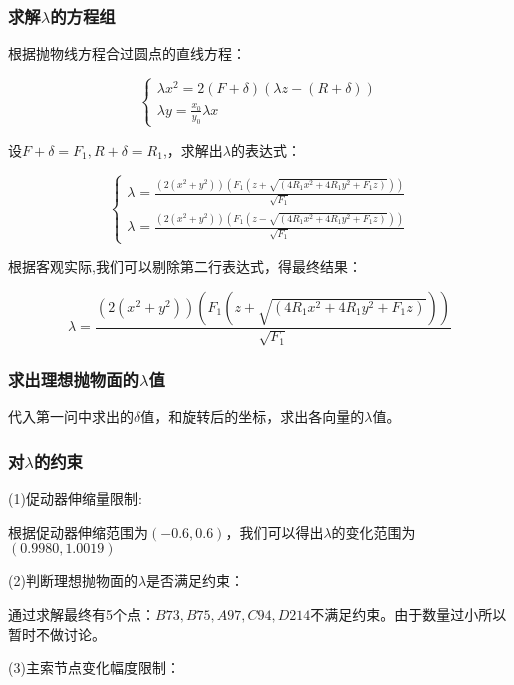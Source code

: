 \documentclass[withoutpreface,bwprint]{cumcmthesis} %
\numberwithin{equation}{subsection}
\begin{document}
\subsubsection{求解$\lambda$的方程组}
根据抛物线方程合过圆点的直线方程：

\begin{equation}
	\left\{\begin{array}{l}
	\lambda x^2=2(F+\delta)(\lambda z-(R+\delta))\\
	\lambda	y=\frac{x_0{}}{y_0{}}\lambda x
	\end{array}\right.
\end{equation}

设$F+\delta=F_1{},R+\delta=R_1{}$,，求解出$\lambda$的表达式：

\begin{equation}
	\left\{\begin{array}{l}
	\lambda=\frac{(2(x^{2}+y^{2}))(F_1(z+\sqrt{(4R_1x^{2}+4R_1y^{2}+F_1z^{})}))}{\sqrt{F_1}}\\
	\lambda=\frac{(2(x^{2}+y^{2}))(F_1(z-\sqrt{(4R_1x^{2}+4R_1y^{2}+F_1z^{})}))}{\sqrt{F_1}}	
	\end{array}\right.
\end{equation}

根据客观实际,我们可以剔除第二行表达式，得最终结果：

\begin{equation}
		\lambda=\frac{(2(x^{2}+y^{2}))(F_1(z+\sqrt{(4R_1x^{2}+4R_1y^{2}+F_1z^{})}))}{\sqrt{F_1}}
\end{equation}

\subsubsection{求出理想抛物面的$\lambda$值}
代入第一问中求出的$\delta$值，和旋转后的坐标，求出各向量的$\lambda$值。

\subsubsection{对$\lambda$的约束}

(1)促动器伸缩量限制:

根据促动器伸缩范围为$(-0.6,0.6)$，我们可以得出$\lambda$的变化范围为$(0.9980,1.0019)$

(2)判断理想抛物面的$\lambda$是否满足约束：

通过求解最终有5个点：$B73,B75,A97,C94,D214$不满足约束。由于数量过小所以暂时不做讨论。

(3)主索节点变化幅度限制：
\end{document}
